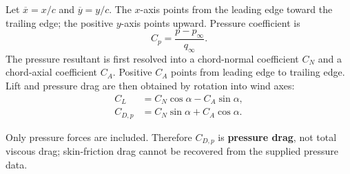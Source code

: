 \documentclass[11pt]{article}
\newcommand{\X}{\overline{x}}
\begin{document}
Let $\X=x/c$ and $\overline y=y/c$. The $x$-axis points from the leading edge toward the trailing edge; the positive $y$-axis points upward. Pressure coefficient is
\begin{equation}
C_p=\frac{p-p_\infty}{q_\infty}.
\end{equation}
The pressure resultant is first resolved into a chord-normal coefficient $C_N$ and a chord-axial coefficient $C_A$. Positive $C_A$ points from leading edge to trailing edge. Lift and pressure drag are then obtained by rotation into wind axes:
\begin{align}
C_L &= C_N\cos\alpha-C_A\sin\alpha,\\
C_{D,p} &= C_N\sin\alpha+C_A\cos\alpha.
\end{align}

\begin{center}
\end{center}

Only pressure forces are included. Therefore $C_{D,p}$ is \textbf{pressure drag}, not total viscous drag; skin-friction drag cannot be recovered from the supplied pressure data.
\end{document}
